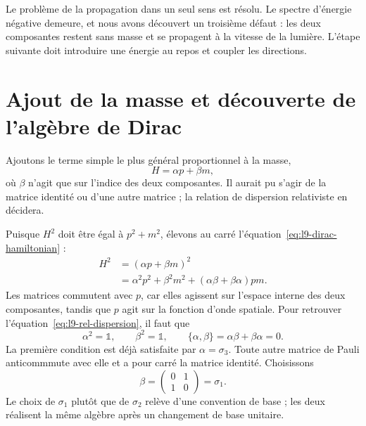 Le problème de la propagation dans un seul sens est résolu. Le spectre d’énergie négative demeure, et nous avons découvert un troisième défaut : les deux composantes restent sans masse et se propagent à la vitesse de la lumière. L’étape suivante doit introduire une énergie au repos et coupler les directions.

\section{Ajout de la masse et découverte de l’algèbre de Dirac}

Ajoutons le terme simple le plus général proportionnel à la masse,
\begin{equation}
H=\alpha p+\beta m,
\label{eq:l9-dirac-hamiltonian}
\end{equation}
où \(\beta\) n’agit que sur l’indice des deux composantes. Il aurait pu s’agir de la matrice identité ou d’une autre matrice ; la relation de dispersion relativiste en décidera.

Puisque \(H^2\) doit être égal à \(p^2+m^2\), élevons au carré l’équation~\eqref{eq:l9-dirac-hamiltonian} :
\begin{align}
H^2
&=(\alpha p+\beta m)^2\\
&=\alpha^2p^2+\beta^2m^2
+(\alpha\beta+\beta\alpha)pm.
\label{eq:l9-square-dirac}
\end{align}
Les matrices commutent avec \(p\), car elles agissent sur l’espace interne des deux composantes, tandis que \(p\) agit sur la fonction d’onde spatiale. Pour retrouver l’équation~\eqref{eq:l9-rel-dispersion}, il faut que
\begin{equation}
\alpha^2=\mathbb{1},
\qquad
\beta^2=\mathbb{1},
\qquad
\{\alpha,\beta\}
=\alpha\beta+\beta\alpha=0.
\label{eq:l9-dirac-algebra}
\end{equation}
La première condition est déjà satisfaite par \(\alpha=\sigma_3\). Toute autre matrice de Pauli anticommmute avec elle et a pour carré la matrice identité. Choisissons
\begin{equation}
\beta=
\begin{pmatrix}
0&1\\
1&0
\end{pmatrix}
=\sigma_1.
\label{eq:l9-beta}
\end{equation}
Le choix de \(\sigma_1\) plutôt que de \(\sigma_2\) relève d’une convention de base ; les deux réalisent la même algèbre après un changement de base unitaire.

\begin{classroomqa}
\end{classroomqa}

